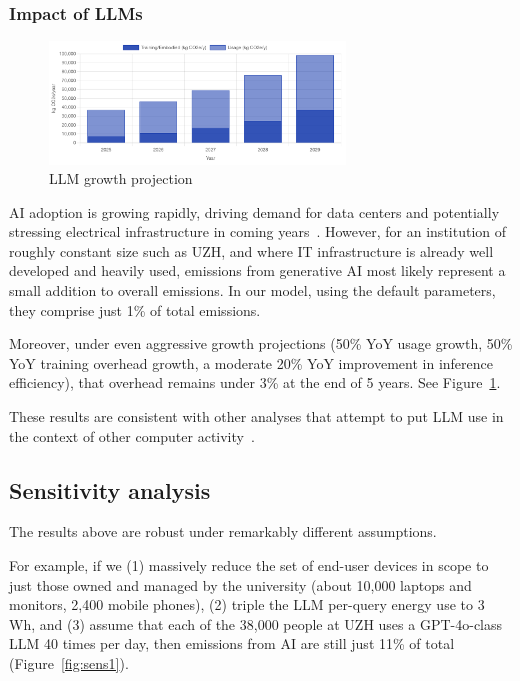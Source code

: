 \documentclass[11pt]{article}
\let\cite\parencite
\begin{document}
\subsubsection*{Impact of LLMs}

\begin{figure}[h]
  \centering
  \includegraphics[width=0.7\textwidth]{fig-llm-growth.png}
  \caption{LLM growth projection}
  \label{fig:llm:growth}
\end{figure}

AI adoption is growing rapidly, driving demand for data centers and potentially stressing electrical infrastructure in coming years~\cite{lbl:dc:2024,iea:ai:energy}. However, for an institution of roughly constant size such as UZH, and where IT infrastructure is already well developed and heavily used, emissions from generative AI most likely represent a small addition to overall emissions. In our model, using the default parameters, they comprise just 1\% of total emissions.

Moreover, under even aggressive growth projections (50\% YoY usage growth, 50\% YoY training overhead growth, a moderate 20\% YoY improvement in inference efficiency), that overhead remains under 3\% at the end of 5 years. See Figure~\ref{fig:llm:growth}.

These results are consistent with other analyses that attempt to put LLM use in the context of other computer activity~\cite{epoch2025howmuchenergydoeschatgptuse,ritchie:chatgpt}.

\subsection{Sensitivity analysis}
\label{sec:sensitivity:analysis}

The results above are robust under remarkably different assumptions.

For example, if we (1) massively reduce the set of end-user devices in scope to just those owned and managed by the university (about 10,000 laptops and monitors, 2,400 mobile phones), (2) triple the LLM per-query energy use to 3 Wh, and (3) assume that each of the 38,000 people at UZH uses a GPT-4o-class LLM 40 times per day, then emissions from AI are still just 11\% of total (Figure~\ref{fig:sens1}).
\end{document}
